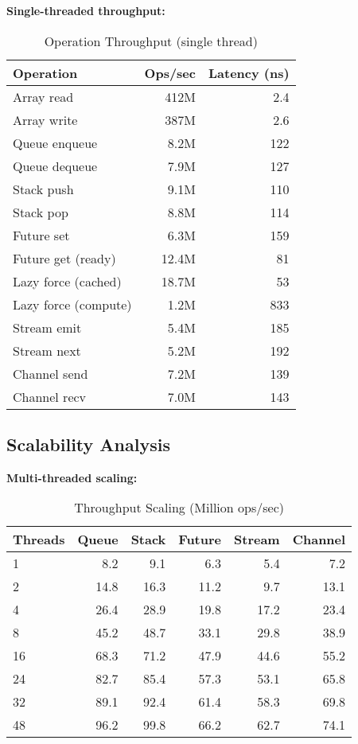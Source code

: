 \documentclass[letterpaper,twocolumn,10pt]{article}
\begin{document}
\textbf{Single-threaded throughput:}

\begin{table}[h]
\centering
\caption{Operation Throughput (single thread)}
\label{tab:throughput}
\begin{tabular}{lrr}
\toprule
Operation & Ops/sec & Latency (ns) \\
\midrule
Array read & 412M & 2.4 \\
Array write & 387M & 2.6 \\
Queue enqueue & 8.2M & 122 \\
Queue dequeue & 7.9M & 127 \\
Stack push & 9.1M & 110 \\
Stack pop & 8.8M & 114 \\
Future set & 6.3M & 159 \\
Future get (ready) & 12.4M & 81 \\
Lazy force (cached) & 18.7M & 53 \\
Lazy force (compute) & 1.2M & 833 \\
Stream emit & 5.4M & 185 \\
Stream next & 5.2M & 192 \\
Channel send & 7.2M & 139 \\
Channel recv & 7.0M & 143 \\
\bottomrule
\end{tabular}
\end{table}

\subsection{Scalability Analysis}

\textbf{Multi-threaded scaling:}

\begin{table}[h]
\centering
\caption{Throughput Scaling (Million ops/sec)}
\label{tab:scaling}
\begin{tabular}{lrrrrr}
\toprule
Threads & Queue & Stack & Future & Stream & Channel \\
\midrule
1 & 8.2 & 9.1 & 6.3 & 5.4 & 7.2 \\
2 & 14.8 & 16.3 & 11.2 & 9.7 & 13.1 \\
4 & 26.4 & 28.9 & 19.8 & 17.2 & 23.4 \\
8 & 45.2 & 48.7 & 33.1 & 29.8 & 38.9 \\
16 & 68.3 & 71.2 & 47.9 & 44.6 & 55.2 \\
24 & 82.7 & 85.4 & 57.3 & 53.1 & 65.8 \\
32 & 89.1 & 92.4 & 61.4 & 58.3 & 69.8 \\
48 & 96.2 & 99.8 & 66.2 & 62.7 & 74.1 \\
\bottomrule
\end{tabular}
\end{table}
\end{document}
